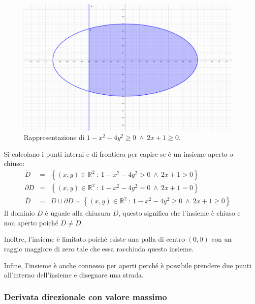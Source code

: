 \documentclass[a4paper]{article}
\begin{document}
	\begin{figure}[!htp]
		\centering
		\includegraphics[width=\textwidth]{img/exercise/2023-09-06-A-ex3(a).pdf}
		\caption*{Rappresentazione di $1 - x^{2} - 4y^{2} \ge 0 \: \land \: 2x + 1 \ge 0$.}
	\end{figure}

	\noindent
	Si calcolano i punti interni e di frontiera per capire se è un insieme aperto o chiuso:
	\begin{equation*}
		\begin{array}{rcl}
			\mathring{D} &=& \left\{\left(x,y\right) \in \mathbb{R}^{2} \: : \: 1 - x^{2} - 4y^{2} > 0 \: \land \: 2x + 1 > 0\right\} \\ [.8em]
			\partial D &=& \left\{\left(x,y\right) \in \mathbb{R}^{2} \: : \: 1 - x^{2} - 4y^{2} = 0 \: \land \: 2x + 1 = 0\right\} \\ [.8em]
			\overline{D} &=& D \cup \partial D = \left\{\left(x,y\right) \in \mathbb{R}^{2} \: : \: 1 - x^{2} - 4y^{2} \ge 0 \: \land \: 2x + 1 \ge 0\right\}
		\end{array}
	\end{equation*}
	Il dominio $D$ è uguale alla chiusura $\overline{D}$, questo significa che l'insieme è chiuso e non aperto poiché $D \ne \mathring{D}$.

	Inoltre, l'insieme è limitato poiché esiste una palla di centro $\left(0,0\right)$ con un raggio maggiore di zero tale che essa racchiuda questo insieme.

	Infine, l'insieme è anche connesso per aperti perché è possibile prendere due punti all'interno dell'insieme e disegnare una strada.\newpage

	\subsubsection{Derivata direzionale con valore massimo}
\end{document}
